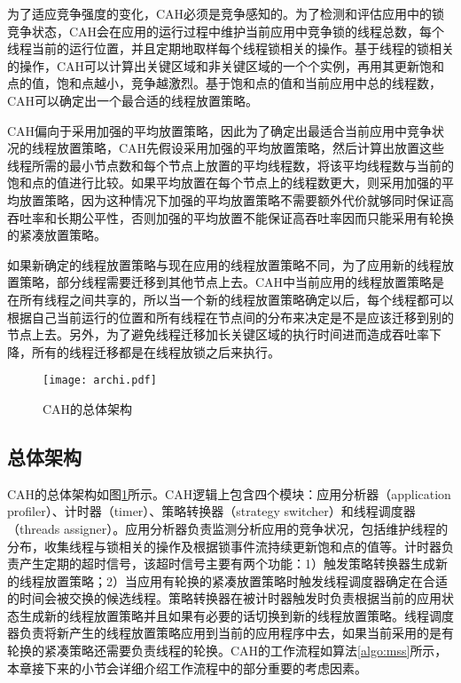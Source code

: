 为了适应竞争强度的变化，CAH必须是竞争感知的。为了检测和评估应用中的锁竞争状态，CAH会在应用的运行过程中维护当前应用中竞争锁的线程总数，每个线程当前的运行位置，并且定期地取样每个线程锁相关的操作。基于线程的锁相关的操作，CAH可以计算出关键区域和非关键区域的一个个实例，再用其更新饱和点的值，饱和点越小，竞争越激烈。基于饱和点的值和当前应用中总的线程数，CAH可以确定出一个最合适的线程放置策略。

CAH偏向于采用加强的平均放置策略，因此为了确定出最适合当前应用中竞争状况的线程放置策略，CAH先假设采用加强的平均放置策略，然后计算出放置这些线程所需的最小节点数和每个节点上放置的平均线程数，将该平均线程数与当前的饱和点的值进行比较。如果平均放置在每个节点上的线程数更大，则采用加强的平均放置策略，因为这种情况下加强的平均放置策略不需要额外代价就够同时保证高吞吐率和长期公平性，否则加强的平均放置不能保证高吞吐率因而只能采用有轮换的紧凑放置策略。

如果新确定的线程放置策略与现在应用的线程放置策略不同，为了应用新的线程放置策略，部分线程需要迁移到其他节点上去。CAH中当前应用的线程放置策略是在所有线程之间共享的，所以当一个新的线程放置策略确定以后，每个线程都可以根据自己当前运行的位置和所有线程在节点间的分布来决定是不是应该迁移到别的节点上去。另外，为了避免线程迁移加长关键区域的执行时间进而造成吞吐率下降，所有的线程迁移都是在线程放锁之后来执行。

\begin{figure}[t]
	\centering
	\texttt{[image: archi.pdf]}
	\caption{CAH的总体架构}
	\label{Fig:archi}
\end{figure}

\subsection{总体架构}
CAH的总体架构如图\ref{Fig:archi}所示。CAH逻辑上包含四个模块：应用分析器（application profiler）、计时器（timer）、策略转换器（strategy switcher）和线程调度器（threads assigner）。应用分析器负责监测分析应用的竞争状况，包括维护线程的分布，收集线程与锁相关的操作及根据锁事件流持续更新饱和点的值等。计时器负责产生定期的超时信号，该超时信号主要有两个功能：1）触发策略转换器生成新的线程放置策略；2）当应用有轮换的紧凑放置策略时触发线程调度器确定在合适的时间会被交换的候选线程。策略转换器在被计时器触发时负责根据当前的应用状态生成新的线程放置策略并且如果有必要的话切换到新的线程放置策略。线程调度器负责将新产生的线程放置策略应用到当前的应用程序中去，如果当前采用的是有轮换的紧凑策略还需要负责线程的轮换。CAH的工作流程如算法\ref{algo:mss}所示，本章接下来的小节会详细介绍工作流程中的部分重要的考虑因素。

